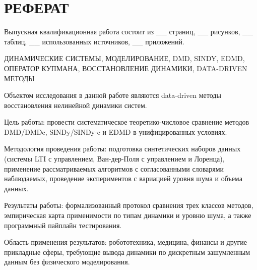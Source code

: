 \chapter*{РЕФЕРАТ}


Выпускная квалификационная работа состоит из \_\_ страниц, \_\_ рисунков, \_\_ таблиц, \_\_ использованных источников, \_\_ приложений. 

ДИНАМИЧЕСКИЕ СИСТЕМЫ, МОДЕЛИРОВАНИЕ, DMD, SINDY, EDMD, ОПЕРАТОР КУПМАНА, ВОССТАНОВЛЕНИЕ ДИНАМИКИ, DATA-DRIVEN МЕТОДЫ

Объектом исследования в данной работе являются data-driven методы восстановления нелинейной динамики систем.

Цель работы: провести систематическое теоретико-числовое сравнение методов DMD/DMDc, SINDy/SINDy-c и EDMD в унифицированных условиях.

Методология проведения работы: подготовка синтетических наборов данных (системы LTI с управлением, Ван-дер-Поля с управлением и Лоренца), применение рассматриваемых алгоритмов с согласованными словарями наблюдаемых, проведение экспериментов с вариацией уровня шума и объема данных.

Результаты работы: формализованный протокол сравнения трех классов методов, эмпирическая карта применимости по типам динамики и уровню шума, а также программный пайплайн тестирования.

Область применения результатов: робототехника, медицина, финансы и другие прикладные сферы, требующие вывода динамики по дискретным зашумленным данным без физического моделирования.

